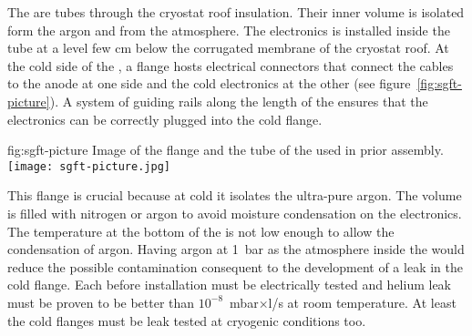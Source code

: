 The  are tubes through the cryostat roof insulation.
Their inner volume is isolated form the argon and from the atmosphere.
The electronics is installed inside the tube at a level few cm below the corrugated membrane of the cryostat roof.
At the cold side of the , a flange hosts electrical connectors that connect the cables to the anode at one side and the cold electronics at the other (see figure~\ref{fig:sgft-picture}).
A system of guiding rails along the length of the  ensures that the electronics can be correctly plugged into the cold flange.
\begin{dunefigure}{fig:sgft-picture}
{Image of the flange and the tube of the  used in  prior assembly.}
\texttt{[image: sgft-picture.jpg]}
\end{dunefigure}
This flange is crucial because at cold it isolates the ultra-pure argon.
The  volume is filled with nitrogen or argon to avoid moisture condensation on the electronics.
The temperature at the bottom of the  is not low enough to allow the condensation of argon.
Having argon at 1~bar as the atmosphere inside the  would reduce the possible  contamination consequent to the development of a leak in the cold flange.
Each  before installation must be electrically tested and helium leak must be proven to be better than $10^{-8}$~mbar$\times$l/s at room temperature.
At least the cold flanges must be leak tested at cryogenic conditions too.




